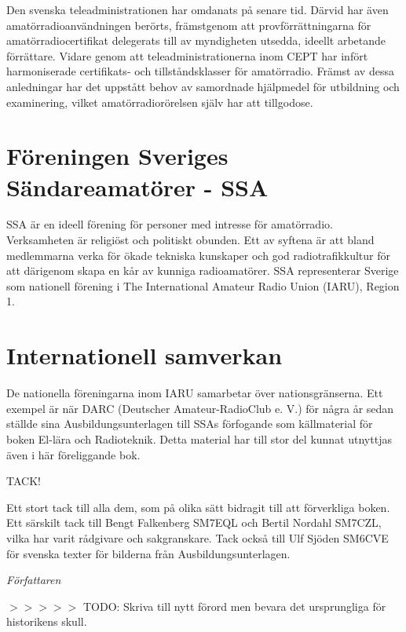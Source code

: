 \begin{rev-ogranskat}
Den svenska teleadministrationen har omdanats på senare tid. Därvid har även
amatörradioanvändningen berörts, främstgenom att provförrättningarna för
amatörradiocertifikat delegerats till av myndigheten utsedda, ideellt arbetande
förrättare. Vidare genom att teleadministrationerna inom CEPT har infört
harmoniserade certifikats- och tillståndsklasser för amatörradio. Främst av
dessa anledningar har det uppstått behov av samordnade hjälpmedel för utbildning
och examinering, vilket amatörradiorörelsen själv har att tillgodose.

\section*{Föreningen Sveriges Sändareamatörer - SSA}

SSA är en ideell förening för personer med intresse för amatörradio.
Verksamheten är religiöst och politiskt obunden. Ett av syftena är att bland
medlemmarna verka för ökade tekniska kunskaper och god radiotrafikkultur för att
därigenom skapa en kår av kunniga radioamatörer. SSA representerar Sverige som
nationell förening i The International Amateur Radio Union (IARU), Region 1.

\section*{Internationell samverkan}

De nationella föreningarna inom IARU samarbetar över nationsgränserna. Ett
exempel är när DARC (Deutscher Amateur-RadioClub e. V.) för några år sedan
ställde sina Ausbildungsunterlagen till SSAs förfogande som källmaterial för
boken El-lära och Radioteknik. Detta material har till stor del kunnat utnyttjas
även i här föreliggande bok.
\end{rev-ogranskat}

\clearpage

\begin{rev-ogranskat}
TACK!

Ett stort tack till alla dem, som på olika sätt bidragit till att förverkliga
boken. Ett särskilt tack till Bengt Falkenberg SM7EQL och Bertil Nordahl SM7CZL,
vilka har varit rådgivare och sakgranskare. Tack också till Ulf Sjöden SM6CVE
för svenska texter för bilderna från Ausbildungsunterlagen.

\emph{Författaren}

$>>>>>$ TODO: Skriva till nytt förord men bevara det ursprungliga för 
historikens skull.

\end{rev-ogranskat}

\twocolumn